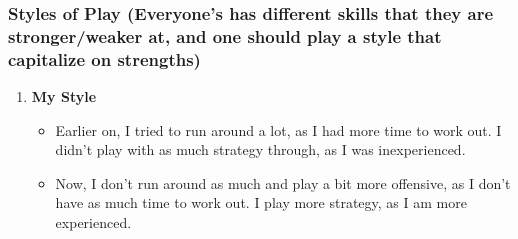 \begin{frame}
\frametitle{ Styles of Play (Everyone's has different skills that they are stronger/weaker at, and one should play a style that capitalize on strengths)  }

\begin{enumerate}

\item \small \textbf{My Style}
\begin{itemize}
\item \tiny Earlier on, I tried to run around a lot, as I had more time to work out. I didn't play with as much strategy through, as I was inexperienced.
\item \tiny Now, I don't run around as much and play a  bit more offensive, as I don't have as much time to work out. I  play more strategy, as I am more experienced.
\end{itemize}
\end{enumerate}
\end{frame}

